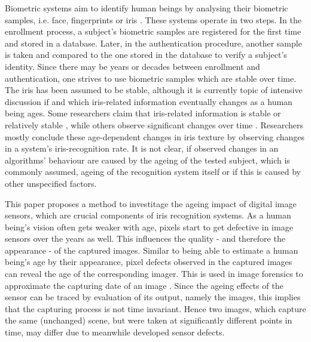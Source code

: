 \documentclass[10pt,twocolumn,letterpaper]{article}
\begin{document}
Biometric systems aim to identify human beings by analysing their biometric samples, i.e. face, fingerprints or iris \cite{rathgeb}. These systems operate in two steps. In the enrollment process, a subject's biometric samples are registered for the first time and stored in a database. Later, in the authentication procedure, another sample is taken and compared to the one stored in the database to verify a subject's identity. Since there may be years or decades between enrollment and authentication, one strives to use biometric samples which are stable over time. The iris has been assumed to be stable, although it is currently topic of intensive discussion if and which iris-related information eventually changes as a human being ages. Some researchers claim that iris-related information is stable or relatively stable \cite{daugmanNoChange,BGrother13a}, while others observe significant changes over time \cite{rankinChange, rankinChangeResponse, fenkerIrisAging, czajkaTemplateAging, fairhurstNonstability}. Researchers mostly conclude these age-dependent changes in iris texture by observing changes in a system's iris-recognition rate. It is not clear, if observed changes in an algorithms' behaviour are caused by the ageing of the tested subject, which is commonly assumed, ageing of the recognition system itself or if this is caused by other unspecified factors.

This paper proposes a method to investitage the ageing impact of digital image sensors, which are crucial components of iris recognition systems. As a human being's vision often gets weaker with age, pixels start to get defective in image sensors over the years as well. This influences the quality - and therefore the appearance - of the captured images. Similar to being able to estimate a human being's age by their appearance, pixel defects observed in the captured images can reveal the age of the corresponding imager. This is used in image forensics to approximate the capturing date of an image \cite{fridrich}. Since the ageing effects of the sensor can be traced by evaluation of its output, namely the images, this implies that the capturing process is not time invariant. Hence two images, which capture the same (unchanged) scene, but were taken at significantly different points in time, may differ due to meanwhile developed sensor defects.
\end{document}
